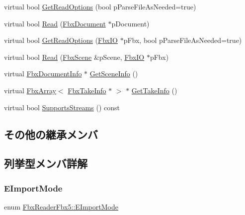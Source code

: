 \begin{DoxyCompactItemize}
\item 
virtual bool \hyperlink{class_fbx_reader_fbx5_a30c6a2a6f02fddffecec9cabf9f51ed7}{Get\+Read\+Options} (bool p\+Parse\+File\+As\+Needed=true)
\item 
virtual bool \hyperlink{class_fbx_reader_fbx5_aac75f44d42d473ac88a54c81ec5b1af6}{Read} (\hyperlink{class_fbx_document}{Fbx\+Document} $\ast$p\+Document)
\item 
virtual bool \hyperlink{class_fbx_reader_fbx5_a6c8620d040add56c30500a593b4e56d6}{Get\+Read\+Options} (\hyperlink{class_fbx_i_o}{Fbx\+IO} $\ast$p\+Fbx, bool p\+Parse\+File\+As\+Needed=true)
\item 
virtual bool \hyperlink{class_fbx_reader_fbx5_a9f5142bf143ff9192bb7d687c831ad21}{Read} (\hyperlink{class_fbx_scene}{Fbx\+Scene} \&p\+Scene, \hyperlink{class_fbx_i_o}{Fbx\+IO} $\ast$p\+Fbx)
\item 
virtual \hyperlink{class_fbx_document_info}{Fbx\+Document\+Info} $\ast$ \hyperlink{class_fbx_reader_fbx5_af685112183765e2a278bbbc898374074}{Get\+Scene\+Info} ()
\item 
virtual \hyperlink{class_fbx_array}{Fbx\+Array}$<$ \hyperlink{class_fbx_take_info}{Fbx\+Take\+Info} $\ast$ $>$ $\ast$ \hyperlink{class_fbx_reader_fbx5_a4680a5c4695d3692582d3ca8db71cd01}{Get\+Take\+Info} ()
\item 
virtual bool \hyperlink{class_fbx_reader_fbx5_ae6f619a41303077d9d4ed2935f3d2108}{Supports\+Streams} () const
\end{DoxyCompactItemize}
\subsection*{その他の継承メンバ}


\subsection{列挙型メンバ詳解}
\mbox{\label{class_fbx_reader_fbx5_a9d205ec64b33007dd74af093943b50c5}} 
\subsubsection{\texorpdfstring{E\+Import\+Mode}{EImportMode}}
{\footnotesize\ttfamily enum \hyperlink{class_fbx_reader_fbx5_a9d205ec64b33007dd74af093943b50c5}{Fbx\+Reader\+Fbx5\+::\+E\+Import\+Mode}}

